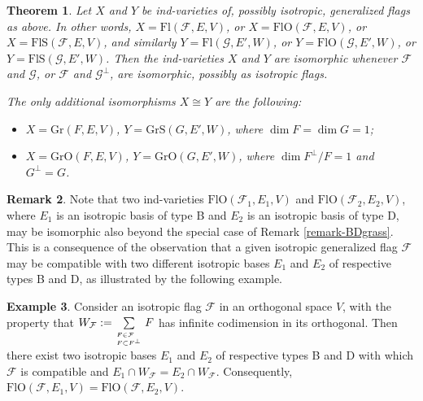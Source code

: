 \documentclass[12pt]{amsart}
\newcommand{\Flags}{\mathrm{Fl}}
\newcommand{\Grass}{\mathrm{Gr}}
\newcommand{\OFlags}{\mathrm{FlO}}
\newcommand{\OGrass}{\mathrm{GrO}}
\newcommand{\SFlags}{\mathrm{FlS}}
\newcommand{\SGrass}{\mathrm{GrS}}
\newtheorem{theorem}{Theorem}[section]
\theoremstyle{definition}
\newtheorem{example}[theorem]{Example}
\newtheorem{remark}[theorem]{Remark}
\begin{document}
\begin{theorem} \label{T-main}
Let $X$ and $Y$ be ind-varieties of, possibly isotropic, generalized flags as above. In other words, $X=\Flags(\mathcal{F},E,V)$, or $X=\OFlags(\mathcal{F},E,V)$, or $X=\SFlags(\mathcal{F},E,V)$, and similarly
$Y=\Flags(\mathcal{G},E',W)$, or $Y=\OFlags(\mathcal{G},E',W)$, or $Y=\SFlags(\mathcal{G},E',W)$.
Then the ind-varieties $X$ and $Y$ are isomorphic whenever $\mathcal{F}$ and $\mathcal{G}$, or $\mathcal{F}$ and $\mathcal{G}^\perp$, are isomorphic, possibly as isotropic flags.

The only additional isomorphisms $X\cong Y$ are the following:
\begin{itemize}
\item $X=\Grass(F,E,V)$, $Y=\SGrass(G,E',W)$, where $\dim F=\dim G=1$;
\item $X=\OGrass(F,E,V)$, $Y=\OGrass(G,E',W)$, where $\dim F^\perp/F=1$ and $G^\perp=G$.
\end{itemize}
\end{theorem}


\begin{remark}
Note that two ind-varieties  $\OFlags(\mathcal{F}_1,E_1,V)$
and $\OFlags(\mathcal{F}_2,E_2,V)$, where $E_1$ is an isotropic basis of type B and $E_2$ is an isotropic basis of type D, may be isomorphic also beyond the special case of Remark \ref{remark-BDgrass}. This is a consequence of the observation that a given isotropic generalized flag $\mathcal{F}$ may be compatible with two different isotropic bases $E_1$ and $E_2$ of respective types B and D, as illustrated by the following example. 
\end{remark}

\begin{example} \label{E2.7}
Consider an isotropic flag $\mathcal{F}$ in an orthogonal space $V$, with the property that $W_\mathcal{F}:=\sum\limits_{\atop^{F\in\mathcal{F}}_{F\subset F^\perp}}F$ has infinite codimension in its orthogonal. Then there exist two isotropic bases $E_1$ and $E_2$ of respective types B and D with which $\mathcal{F}$ is compatible
and $E_1\cap W_\mathcal{F}=E_2\cap W_\mathcal{F}$. Consequently, $\OFlags(\mathcal{F},E_1,V)=\OFlags(\mathcal{F},E_2,V)$.


\end{example}
\end{document}
